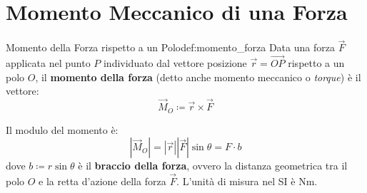 \section{Momento Meccanico di una Forza}
\label{sec:momento_forza}

\begin{definizione}{Momento della Forza rispetto a un Polo}{def:momento_forza}
Data una forza $\vec{F}$ applicata nel punto $P$ individuato dal vettore posizione $\vec{r} = \vec{OP}$ rispetto a un polo $O$, il \textbf{momento della forza} (detto anche momento meccanico o \emph{torque}) è il vettore:
\begin{equation}
    \vec{M}_O \coloneqq \vec{r} \times \vec{F}
    \label{eq:momento_forza}
\end{equation}
\end{definizione}

\begin{center}
\end{center}

Il modulo del momento è:
\begin{equation}
    |\vec{M}_O| = |\vec{r}| |\vec{F}| \sin\theta = F \cdot b
    \label{eq:modulo_momento}
\end{equation}
dove $b \coloneqq r\sin\theta$ è il \textbf{braccio della forza}, ovvero la distanza geometrica tra il polo $O$ e la retta d'azione della forza $\vec{F}$. L'unità di misura nel SI è $\si{\newton\metre}$.

